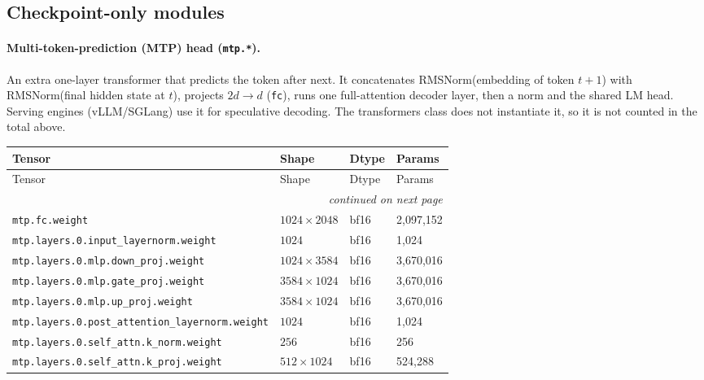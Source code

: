 \documentclass[10pt,a4paper]{article}
\theoremstyle{definition}
\begin{document}
\subsection{Checkpoint-only modules}
\paragraph{Multi-token-prediction (MTP) head (\texttt{mtp.*}).} An extra one-layer transformer that predicts the token after next. It concatenates RMSNorm(embedding of token $t{+}1$) with RMSNorm(final hidden state at $t$), projects $2d\to d$ (\texttt{fc}), runs one full-attention decoder layer, then a norm and the shared LM head. Serving engines (vLLM/SGLang) use it for speculative decoding. The transformers class does not instantiate it, so it is not counted in the total above.
\begin{longtable}{p{8.5cm}lll}
\toprule
Tensor & Shape & Dtype & Params \\
\midrule
\endfirsthead
\toprule
Tensor & Shape & Dtype & Params \\
\midrule
\endhead
\midrule \multicolumn{4}{r}{\textit{continued on next page}} \\
\endfoot
\bottomrule
\endlastfoot
\texttt{mtp.\allowbreak{}fc.\allowbreak{}weight} & $1024 \times 2048$ & bf16 & 2,097,152 \\
\texttt{mtp.\allowbreak{}layers.\allowbreak{}0.\allowbreak{}input\_layernorm.\allowbreak{}weight} & $1024$ & bf16 & 1,024 \\
\texttt{mtp.\allowbreak{}layers.\allowbreak{}0.\allowbreak{}mlp.\allowbreak{}down\_proj.\allowbreak{}weight} & $1024 \times 3584$ & bf16 & 3,670,016 \\
\texttt{mtp.\allowbreak{}layers.\allowbreak{}0.\allowbreak{}mlp.\allowbreak{}gate\_proj.\allowbreak{}weight} & $3584 \times 1024$ & bf16 & 3,670,016 \\
\texttt{mtp.\allowbreak{}layers.\allowbreak{}0.\allowbreak{}mlp.\allowbreak{}up\_proj.\allowbreak{}weight} & $3584 \times 1024$ & bf16 & 3,670,016 \\
\texttt{mtp.\allowbreak{}layers.\allowbreak{}0.\allowbreak{}post\_attention\_layernorm.\allowbreak{}weight} & $1024$ & bf16 & 1,024 \\
\texttt{mtp.\allowbreak{}layers.\allowbreak{}0.\allowbreak{}self\_attn.\allowbreak{}k\_norm.\allowbreak{}weight} & $256$ & bf16 & 256 \\
\texttt{mtp.\allowbreak{}layers.\allowbreak{}0.\allowbreak{}self\_attn.\allowbreak{}k\_proj.\allowbreak{}weight} & $512 \times 1024$ & bf16 & 524,288 \\

\end{longtable}
\end{document}
